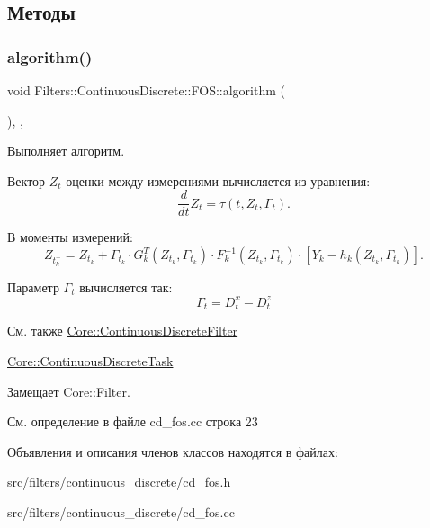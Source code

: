 \subsection{Методы}
\hypertarget{class_filters_1_1_continuous_discrete_1_1_f_o_s_a1e3d6f40678f13a33971bc7bceb45496}{}\label{class_filters_1_1_continuous_discrete_1_1_f_o_s_a1e3d6f40678f13a33971bc7bceb45496} 
\subsubsection{\texorpdfstring{algorithm()}{algorithm()}}
{\footnotesize\ttfamily void Filters\+::\+Continuous\+Discrete\+::\+F\+O\+S\+::algorithm (\begin{DoxyParamCaption}{ }\end{DoxyParamCaption})\hspace{0.3cm}{\ttfamily [override]}, {\ttfamily [protected]}, {\ttfamily [virtual]}}



Выполняет алгоритм. 

Вектор $Z_t$ оценки между измерениями вычисляется из уравнения\+: \[\frac{d}{dt}Z_t = \tau(t,Z_t, \Gamma_t).\]

В моменты измерений\+: \[Z_{t_k^+} = Z_{t_k} + \Gamma_{t_k} \cdot G_k^T(Z_{t_k}, \Gamma_{t_k}) \cdot F_k^{-1}(Z_{t_k}, \Gamma_{t_k}) \cdot [Y_k - h_k(Z_{t_k}, \Gamma_{t_k})].\]

Параметр $\Gamma_t$ вычисляется так\+: \[\Gamma_t = D_t^x - D_t^z\]

\begin{DoxySeeAlso}{См. также}
\hyperlink{class_core_1_1_continuous_discrete_filter}{Core\+::\+Continuous\+Discrete\+Filter} 

\hyperlink{class_core_1_1_continuous_discrete_task}{Core\+::\+Continuous\+Discrete\+Task} 
\end{DoxySeeAlso}


Замещает \hyperlink{class_core_1_1_filter_a438681ee3e54aba2148042d9f8011ab8}{Core\+::\+Filter}.



См. определение в файле cd\+\_\+fos.\+cc строка 23



Объявления и описания членов классов находятся в файлах\+:\begin{DoxyCompactItemize}
\item 
src/filters/continuous\+\_\+discrete/cd\+\_\+fos.\+h\item 
src/filters/continuous\+\_\+discrete/cd\+\_\+fos.\+cc\end{DoxyCompactItemize}
